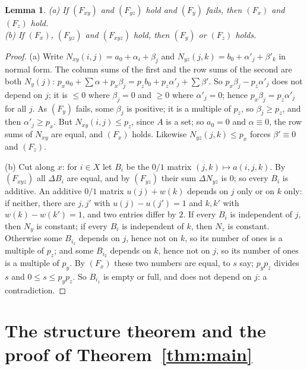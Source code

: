 \documentclass[11pt,a4paper]{amsart}
\newtheorem{lemma}[theorem]{Lemma}
\theoremstyle{definition}
\theoremstyle{remark}
\begin{document}
\begin{lemma}\label{lem:six}
\textup{(a)} If $(F_{xy})$ and $(F_{yz})$ hold and $(F_y)$ fails, then $(F_x)$ and $(F_z)$ hold.\\
\textup{(b)} If $(F_x)$, $(F_{yz})$ and $(F_{xyz})$ hold, then $(F_y)$ or $(F_z)$ holds.
\end{lemma}
\begin{proof}
(a) Write $N_{xy}(i,j)=a_0+\alpha_i+\beta_j$ and $N_{yz}(j,k)=b_0+\alpha'_j+\beta'_k$ in normal form. The column
sums of the first and the row sums of the second are both $N_y(j)$:
$p_xa_0+\sum\alpha+p_x\beta_j=p_zb_0+p_z\alpha'_j+\sum\beta'$. So $p_x\beta_j-p_z\alpha'_j$ does not depend on $j$;
it is $\le 0$ where $\beta_j=0$ and $\ge 0$ where $\alpha'_j=0$; hence $p_x\beta_j=p_z\alpha'_j$ for all $j$. As
$(F_y)$ fails, some $\beta_j$ is positive; it is a multiple of $p_z$, so $\beta_j\ge p_z$, and then
$\alpha'_j\ge p_x$. But $N_{xy}(i,j)\le p_z$, since $A$ is a set; so $a_0=0$ and $\alpha\equiv0$, the row sums of
$N_{xy}$ are equal, and $(F_x)$ holds. Likewise $N_{yz}(j,k)\le p_x$ forces $\beta'\equiv 0$ and $(F_z)$.

(b) Cut along $x$: for $i\in X$ let $B_i$ be the $0/1$ matrix $(j,k)\mapsto a(i,j,k)$. By $(F_{xyz})$ all
$\Delta B_i$ are equal, and by $(F_{yz})$ their sum $\Delta N_{yz}$ is $0$; so every $B_i$ is additive. An
additive $0/1$ matrix $u(j)+w(k)$ depends on $j$ only or on $k$ only: if neither, there are $j,j'$ with
$u(j)-u(j')=1$ and $k,k'$ with $w(k)-w(k')=1$, and two entries differ by $2$. If every $B_i$ is independent of
$j$, then $N_y$ is constant; if every $B_i$ is independent of $k$, then $N_z$ is constant. Otherwise some $B_{i_1}$
depends on $j$, hence not on $k$, so its number of ones is a multiple of $p_z$; and some $B_{i_2}$ depends on $k$,
hence not on $j$, so its number of ones is a multiple of $p_y$. By $(F_x)$ these two numbers are equal, to $s$
say; $p_yp_z$ divides $s$ and $0\le s\le p_yp_z$. So $B_{i_1}$ is empty or full, and does not depend on $j$: a
contradiction.
\end{proof}

\section{The structure theorem and the proof of Theorem~\ref{thm:main}}\label{sec:proof}
\end{document}
